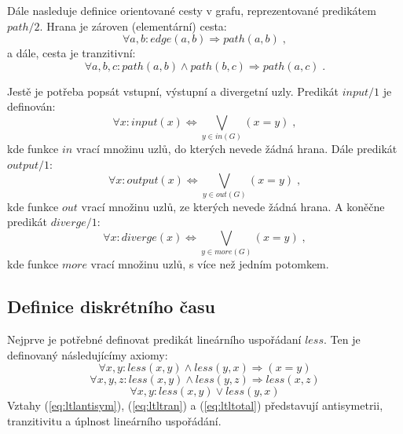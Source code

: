 \documentclass[a4paper,journal]{IEEEtran}
\begin{document}
Dále nasleduje definice orientované cesty v grafu, reprezentované predikátem $path/2$. Hrana je zároven (elementární) cesta:
\begin{equation}
\forall a,b: edge(a,b) \Rightarrow path(a,b)\;,
\end{equation}
a dále, cesta je tranzitivní:
\begin{equation}
	\forall a,b,c: path(a,b)\wedge path(b,c) \Rightarrow path(a,c)\;.
\end{equation}


Jestě je potřeba popsát vstupní, výstupní a divergetní uzly.
Predikát $input/1$ je definován:
\begin{equation}
\forall x: input(x) \Leftrightarrow \bigvee_{y \in in(G)} (x=y)\;,
\end{equation}
kde funkce $in$ vrací množinu uzlů, do kterých nevede žádná hrana. Dále predikát $output/1$:
\begin{equation}
\forall x: output(x) \Leftrightarrow \bigvee_{y \in out(G)} (x=y)\;,
\end{equation}
kde funkce $out$ vrací množinu uzlů, ze kterých nevede žádná hrana. A koněčne predikát $diverge/1$:
\begin{equation}
\forall x: diverge(x) \Leftrightarrow \bigvee_{y \in more(G)} (x=y)\;,
\end{equation}
kde funkce $more$ vrací množinu uzlů, s více než jedním potomkem.


\subsection{Definice diskrétního času}
Nejprve je potřebné definovat predikát lineárního uspořádaní $less$. 
Ten je definovaný následujícímy axiomy:
\begin{equation}\label{eq:ltlantisym}
\forall x,y:  less\left(x,y\right) \wedge less\left(y,x\right)\Rightarrow \left(x = y\right)
\end{equation}
\begin{equation}\label{eq:ltltran}
\forall x,y,z: less\left(x,y\right) \wedge less\left(y,z\right) \Rightarrow less\left(x,z\right) 
\end{equation}
\begin{equation}\label{eq:ltltotal}
\forall x,y: less\left(x,y\right) \vee less\left(y,x\right)
\end{equation}
Vztahy (\ref{eq:ltlantisym}), (\ref{eq:ltltran}) a (\ref{eq:ltltotal}) představují antisymetrii,
tranzitivitu a úplnost lineárního uspořádání.
\end{document}

